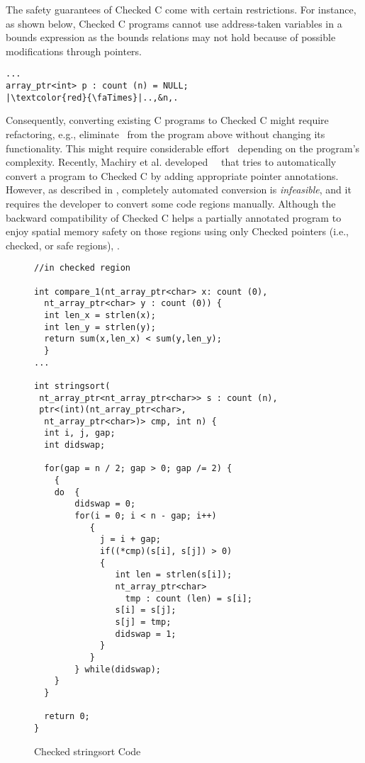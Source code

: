 %
The safety guarantees of Checked C come with certain restrictions. For instance,
as shown below, Checked C programs cannot use address-taken variables in a
bounds expression as the bounds relations may not hold because of possible
modifications through pointers.
% 
\begin{verbatim}
...
array_ptr<int> p : count (n) = NULL;
|\textcolor{red}{\faTimes}|..,&n,.
\end{verbatim}
% 
Consequently, converting existing C programs to Checked C might require
refactoring, e.g., eliminate~ from the program above without
changing its functionality.
% 
This might require considerable effort~\cite{duanrefactoring} depending on the
program's complexity.
% 
Recently, Machiry et al. developed~\threec~\cite{machiry2022c} that tries to
automatically convert a program to Checked C by adding appropriate pointer
annotations.  However, as described in \threec, completely automated conversion
is \emph{infeasible}, and it requires the developer to convert some code regions
manually.  
% 
Although the backward compatibility of Checked C helps a partially annotated
program to enjoy spatial memory safety on those regions using only Checked
pointers (i.e., checked, or safe regions), .

\begin{figure}[t]
{\small
  \begin{lstlisting}[xleftmargin=4 mm]
//in checked region

int compare_1(nt_array_ptr<char> x: count (0),
  nt_array_ptr<char> y : count (0)) { 
  int len_x = strlen(x);
  int len_y = strlen(y);
  return sum(x,len_x) < sum(y,len_y);
  }
...

int stringsort(
 nt_array_ptr<nt_array_ptr<char>> s : count (n),
 ptr<(int)(nt_array_ptr<char>,
  nt_array_ptr<char>)> cmp, int n) {
  int i, j, gap;
  int didswap;
 
  for(gap = n / 2; gap > 0; gap /= 2) {
    {
    do  {
        didswap = 0;
        for(i = 0; i < n - gap; i++)
           {
             j = i + gap;
             if((*cmp)(s[i], s[j]) > 0)
             {
                int len = strlen(s[i]);
                nt_array_ptr<char> 
                  tmp : count (len) = s[i];
                s[i] = s[j];
                s[j] = tmp;
                didswap = 1;
             }
           }
        } while(didswap);
    }
  }

  return 0;
}
  \end{lstlisting}
}
\caption{Checked stringsort Code}
\label{fig:checkedc-example-1}
\end{figure}

